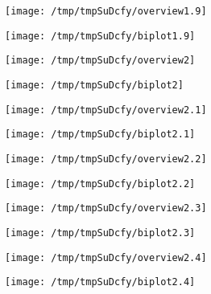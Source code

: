 \documentclass{article}
\begin{document}
\clearpage\centerline{\texttt{[image: /tmp/tmpSuDcfy/overview1.9]}}

\centerline{\texttt{[image: /tmp/tmpSuDcfy/biplot1.9]}}

\clearpage\centerline{\texttt{[image: /tmp/tmpSuDcfy/overview2]}}

\centerline{\texttt{[image: /tmp/tmpSuDcfy/biplot2]}}

\clearpage\centerline{\texttt{[image: /tmp/tmpSuDcfy/overview2.1]}}

\centerline{\texttt{[image: /tmp/tmpSuDcfy/biplot2.1]}}

\clearpage\centerline{\texttt{[image: /tmp/tmpSuDcfy/overview2.2]}}

\centerline{\texttt{[image: /tmp/tmpSuDcfy/biplot2.2]}}

\clearpage\centerline{\texttt{[image: /tmp/tmpSuDcfy/overview2.3]}}

\centerline{\texttt{[image: /tmp/tmpSuDcfy/biplot2.3]}}

\clearpage\centerline{\texttt{[image: /tmp/tmpSuDcfy/overview2.4]}}

\centerline{\texttt{[image: /tmp/tmpSuDcfy/biplot2.4]}}

\clearpage
\end{document}
